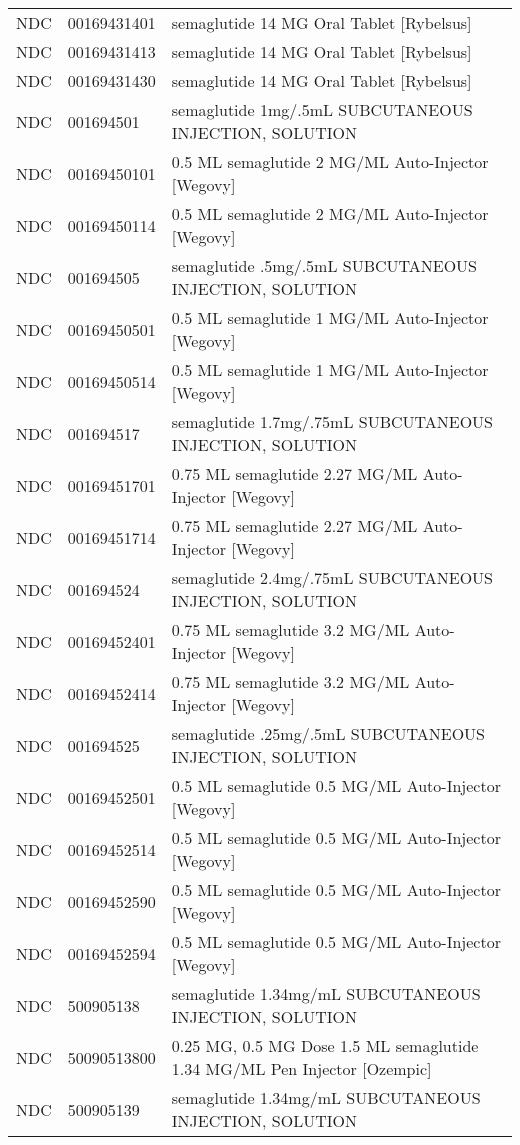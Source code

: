 \begin{longtable}{p{}p{}p{}}
  NDC & 00169431401 & semaglutide 14 MG Oral Tablet [Rybelsus] \\ 
  NDC & 00169431413 & semaglutide 14 MG Oral Tablet [Rybelsus] \\ 
  NDC & 00169431430 & semaglutide 14 MG Oral Tablet [Rybelsus] \\ 
  NDC & 001694501 & semaglutide 1mg/.5mL SUBCUTANEOUS INJECTION, SOLUTION \\ 
  NDC & 00169450101 & 0.5 ML semaglutide 2 MG/ML Auto-Injector [Wegovy] \\ 
  NDC & 00169450114 & 0.5 ML semaglutide 2 MG/ML Auto-Injector [Wegovy] \\ 
  NDC & 001694505 & semaglutide .5mg/.5mL SUBCUTANEOUS INJECTION, SOLUTION \\ 
  NDC & 00169450501 & 0.5 ML semaglutide 1 MG/ML Auto-Injector [Wegovy] \\ 
  NDC & 00169450514 & 0.5 ML semaglutide 1 MG/ML Auto-Injector [Wegovy] \\ 
  NDC & 001694517 & semaglutide 1.7mg/.75mL SUBCUTANEOUS INJECTION, SOLUTION \\ 
  NDC & 00169451701 & 0.75 ML semaglutide 2.27 MG/ML Auto-Injector [Wegovy] \\ 
  NDC & 00169451714 & 0.75 ML semaglutide 2.27 MG/ML Auto-Injector [Wegovy] \\ 
  NDC & 001694524 & semaglutide 2.4mg/.75mL SUBCUTANEOUS INJECTION, SOLUTION \\ 
  NDC & 00169452401 & 0.75 ML semaglutide 3.2 MG/ML Auto-Injector [Wegovy] \\ 
  NDC & 00169452414 & 0.75 ML semaglutide 3.2 MG/ML Auto-Injector [Wegovy] \\ 
  NDC & 001694525 & semaglutide .25mg/.5mL SUBCUTANEOUS INJECTION, SOLUTION \\ 
  NDC & 00169452501 & 0.5 ML semaglutide 0.5 MG/ML Auto-Injector [Wegovy] \\ 
  NDC & 00169452514 & 0.5 ML semaglutide 0.5 MG/ML Auto-Injector [Wegovy] \\ 
  NDC & 00169452590 & 0.5 ML semaglutide 0.5 MG/ML Auto-Injector [Wegovy] \\ 
  NDC & 00169452594 & 0.5 ML semaglutide 0.5 MG/ML Auto-Injector [Wegovy] \\ 
  NDC & 500905138 & semaglutide 1.34mg/mL SUBCUTANEOUS INJECTION, SOLUTION \\ 
  NDC & 50090513800 & 0.25 MG, 0.5 MG Dose 1.5 ML semaglutide 1.34 MG/ML Pen Injector [Ozempic] \\ 
  NDC & 500905139 & semaglutide 1.34mg/mL SUBCUTANEOUS INJECTION, SOLUTION \\ 

\end{longtable}
